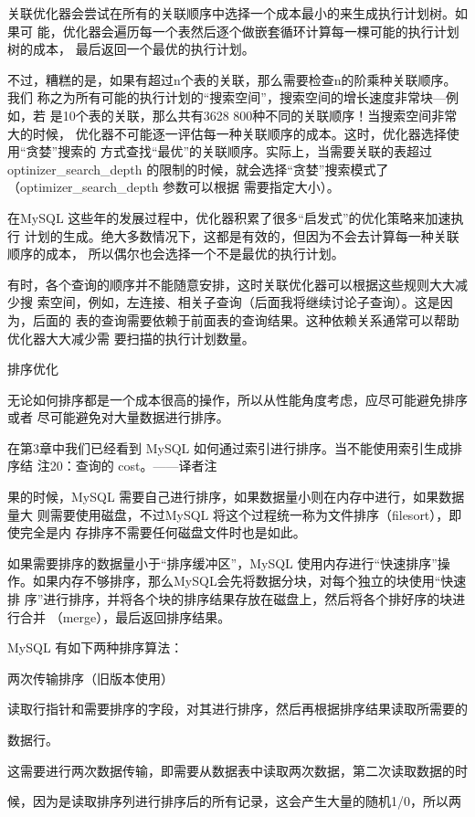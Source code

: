 关联优化器会尝试在所有的关联顺序中选择一个成本最小的来生成执行计划树。如果可
能，优化器会遍历每一个表然后逐个做嵌套循环计算每一棵可能的执行计划树的成本，
最后返回一个最优的执行计划。

不过，糟糕的是，如果有超过n个表的关联，那么需要检查n的阶乘种关联顺序。我们
称之为所有可能的执行计划的“搜索空间”，搜索空间的增长速度非常块—例如，若
是10个表的关联，那么共有3628 800种不同的关联顺序！当搜索空间非常大的时候，
优化器不可能逐一评估每一种关联顺序的成本。这时，优化器选择使用“贪婪”搜索的
方式查找“最优”的关联顺序。实际上，当需要关联的表超过 optinizer\_search\_depth
的限制的时候，就会选择“贪婪”搜索模式了（optimizer\_search\_depth 参数可以根据
需要指定大小）。

在MySQL 这些年的发展过程中，优化器积累了很多“启发式”的优化策略来加速执行
计划的生成。绝大多数情况下，这都是有效的，但因为不会去计算每一种关联顺序的成本，
所以偶尔也会选择一个不是最优的执行计划。

有时，各个查询的顺序并不能随意安排，这时关联优化器可以根据这些规则大大减少搜
索空间，例如，左连接、相关子查询（后面我将继续讨论子查询）。这是因为，后面的
表的查询需要依赖于前面表的查询结果。这种依赖关系通常可以帮助优化器大大减少需
要扫描的执行计划数量。

排序优化

无论如何排序都是一个成本很高的操作，所以从性能角度考虑，应尽可能避免排序或者
尽可能避免对大量数据进行排序。

在第3章中我们已经看到 MySQL 如何通过索引进行排序。当不能使用索引生成排序结
注20：查询的 cost。——译者注

果的时候，MySQL 需要自己进行排序，如果数据量小则在内存中进行，如果数据量大
则需要使用磁盘，不过MySQL 将这个过程统一称为文件排序（filesort），即使完全是内
存排序不需要任何磁盘文件时也是如此。

如果需要排序的数据量小于“排序缓冲区”，MySQL 使用内存进行“快速排序”操
作。如果内存不够排序，那么MySQL会先将数据分块，对每个独立的块使用“快速排
序”进行排序，并将各个块的排序结果存放在磁盘上，然后将各个排好序的块进行合并
（merge），最后返回排序结果。

MySQL 有如下两种排序算法：

两次传输排序（旧版本使用）

读取行指针和需要排序的字段，对其进行排序，然后再根据排序结果读取所需要的

数据行。

这需要进行两次数据传输，即需要从数据表中读取两次数据，第二次读取数据的时

候，因为是读取排序列进行排序后的所有记录，这会产生大量的随机1/0，所以两

